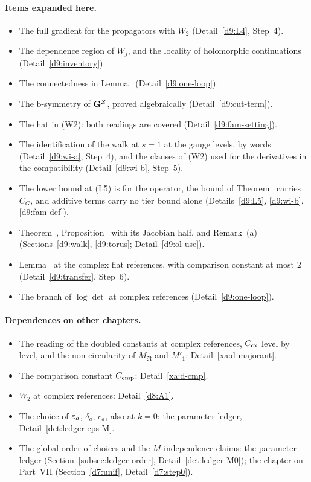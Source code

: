 \paragraph{Items expanded here.}
\begin{itemize}
\item The full gradient for the propagators with $W_2$ (Detail~\ref{d9:L4}, Step~4).
\item The dependence region of $W_j$, and the locality of holomorphic continuations (Detail~\ref{d9:inventory}).
\item The connectedness in Lemma~ (Detail~\ref{d9:one-loop}).
\item The $\mathrm b$-symmetry of $\mathbf G^Z$, proved algebraically (Detail~\ref{d9:cut-term}).
\item The hat in (W2): both readings are covered (Detail~\ref{d9:fam-setting}).
\item The identification of the walk at $s=1$ at the gauge levels, by words (Detail~\ref{d9:wi-a}, Step~4), and the clauses of (W2) used for the derivatives in the compatibility (Detail~\ref{d9:wi-b}, Step~5).
\item The lower bound at (L5) is for the operator, the bound of Theorem~ carries $C_G$, and additive terms carry no tier bound alone (Details~\ref{d9:L5}, \ref{d9:wi-b}, \ref{d9:fam-def}).
\item Theorem~, Proposition~ with its Jacobian half, and Remark~(a) (Sections~\ref{d9:walk}, \ref{d9:torus}; Detail~\ref{d9:ol-use}).
\item Lemma~ at the complex flat references, with comparison constant at most $2$ (Detail~\ref{d9:transfer}, Step~6).
\item The branch of $\log\det$ at complex references (Detail~\ref{d9:one-loop}).
\end{itemize}

\paragraph{Dependences on other chapters.}
\begin{itemize}
\item The reading of the doubled constants at complex references, $C_{\rm cx}$ level by level, and the non-circularity of $M_{\mathfrak N}$ and $M'_1$: Detail~\ref{xa:d-majorant}.
\item The comparison constant $C_{\rm cmp}$: Detail~\ref{xa:d-cmp}.
\item $W_2$ at complex references: Detail~\ref{d8:A1}.
\item The choice of $\varepsilon_a$, $\delta_a$, $c_a$, also at $k=0$: the parameter ledger, Detail~\ref{det:ledger-eps-M}.
\item The global order of choices and the $M$-independence claims: the parameter ledger (Section~\ref{subsec:ledger-order}, Detail~\ref{det:ledger-M0}); the chapter on Part~VII (Section~\ref{d7:unif}, Detail~\ref{d7:step0}).
\end{itemize}

